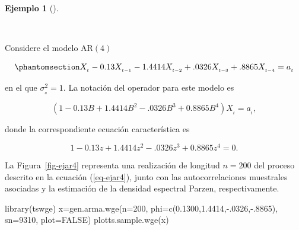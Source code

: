 \documentclass[
  us-letterpaper,
]{scrreprt}
\newenvironment{Shaded}{\begin{snugshade}}{\end{snugshade}}
\newcommand{\AttributeTok}[1]{\textcolor[rgb]{0.40,0.45,0.13}{#1}}
\newcommand{\ConstantTok}[1]{\textcolor[rgb]{0.56,0.35,0.01}{#1}}
\newcommand{\DecValTok}[1]{\textcolor[rgb]{0.68,0.00,0.00}{#1}}
\newcommand{\FloatTok}[1]{\textcolor[rgb]{0.68,0.00,0.00}{#1}}
\newcommand{\FunctionTok}[1]{\textcolor[rgb]{0.28,0.35,0.67}{#1}}
\newcommand{\NormalTok}[1]{\textcolor[rgb]{0.00,0.23,0.31}{#1}}
\newcommand{\OtherTok}[1]{\textcolor[rgb]{0.00,0.23,0.31}{#1}}
\newcommand{\SpecialCharTok}[1]{\textcolor[rgb]{0.37,0.37,0.37}{#1}}
\theoremstyle{plain}
\theoremstyle{definition}
\theoremstyle{definition}
\newtheorem{example}{Ejemplo}[chapter]
\theoremstyle{plain}
\theoremstyle{remark}
\begin{document}
\begin{example}[]\protect\hypertarget{exm-ar4}{}\label{exm-ar4}

~

\begin{tcolorbox}[enhanced jigsaw, bottomtitle=1mm, coltitle=black, breakable, leftrule=.75mm, left=2mm, rightrule=.15mm, titlerule=0mm, toprule=.15mm, toptitle=1mm, colback=white, colframe=quarto-callout-caution-color-frame, title={Un modelo \(\mathrm{AR}(4)\)}, colbacktitle=quarto-callout-caution-color!10!white, arc=.35mm, bottomrule=.15mm, opacitybacktitle=0.6, opacityback=0]

Considere el modelo \(\mathrm{AR}(4)\)

\begin{equation}\phantomsection\label{eq-ejar4}{
X_{_t}-0.13X_{_{t-1}}-1.4414X_{_{t-2}}+.0326X_{_{t-3}}+.8865X_{_{t-4}}=a_{_{t}}
}\end{equation}

en el que \(\sigma_{_a}^2 = 1\). La notación del operador para este
modelo es

\[ (1 - 0.13B + 1.4414B^2 - .0326B^3 + 0.8865 B^4)X_{_t}= a_{_t},\]

donde la correspondiente ecuación característica es

\[1 - 0.13z + 1.4414z^2 - .0326z^3 + 0.8865 z^4 = 0.\]

La Figura~\ref{fig-ejar4} representa una realización de longitud
\(n = 200\) del proceso descrito en la ecuación (\ref{eq-ejar4}), junto
con las autocorrelaciones muestrales asociadas y la estimación de la
densidad espectral Parzen, respectivamente.

\begin{Shaded}
\begin{Highlighting}[]
\FunctionTok{library}\NormalTok{(tswge)}
\NormalTok{x}\OtherTok{=}\FunctionTok{gen.arma.wge}\NormalTok{(}\AttributeTok{n=}\DecValTok{200}\NormalTok{, }\AttributeTok{phi=}\FunctionTok{c}\NormalTok{(}\FloatTok{0.1300}\NormalTok{,}\FloatTok{1.4414}\NormalTok{,}\SpecialCharTok{{-}}\NormalTok{.}\DecValTok{0326}\NormalTok{,}\SpecialCharTok{{-}}\NormalTok{.}\DecValTok{8865}\NormalTok{),}
               \AttributeTok{sn=}\DecValTok{9310}\NormalTok{, }\AttributeTok{plot=}\ConstantTok{FALSE}\NormalTok{)}
\FunctionTok{plotts.sample.wge}\NormalTok{(x)}
\end{Highlighting}
\end{Shaded}

\begin{figure}[H]


\end{figure}
\end{tcolorbox}
\end{example}
\end{document}
